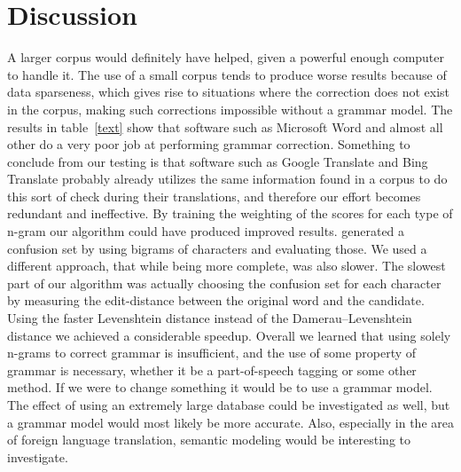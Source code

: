 \documentclass[twocolumn]{article}
\begin{document}
\section{Discussion}
A larger corpus would definitely have helped, given a powerful enough computer to handle it. The use of a small corpus tends to produce worse results because of data sparseness, which gives rise to situations where the correction does not exist in the corpus, making such corrections impossible without a grammar model.
The results in table~\ref{text} show that software such as Microsoft Word and almost all other do a very poor job at performing grammar correction.
Something to conclude from our testing is that software such as Google Translate and Bing Translate probably already utilizes the same information found in a corpus to do this sort of check during their translations, and therefore our effort becomes redundant and ineffective.
By training the weighting of the scores for each type of n-gram our algorithm could have produced improved results.
\cite{Bassil12} generated a confusion set by using bigrams of characters and evaluating those. We used a different approach, that while being more complete, was also slower. The slowest part of our algorithm was actually choosing the confusion set for each character by measuring the edit-distance between the original word and the candidate. Using the faster Levenshtein distance instead of the Damerau–Levenshtein distance we achieved a considerable speedup. Overall we learned that using solely n-grams to correct grammar is insufficient, and the use of some property of grammar is necessary, whether it be a part-of-speech tagging or some other method. If we were to change something it would be to use a grammar model. The effect of using an extremely large database could be investigated as well, but a grammar model would most likely be more accurate. Also, especially in the area of foreign language translation, semantic modeling would be interesting to investigate.


\small

\end{document}

